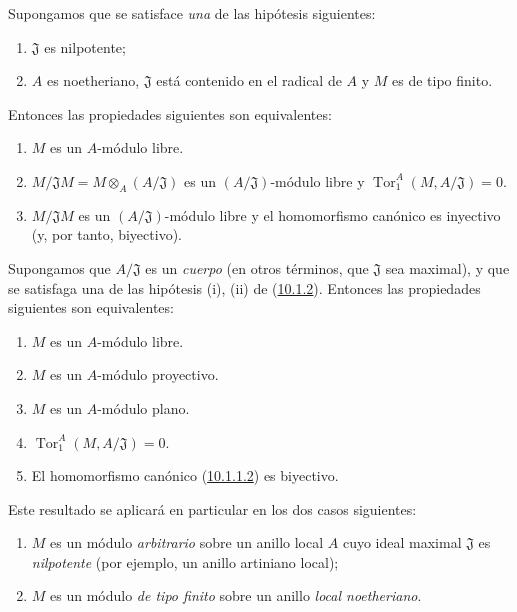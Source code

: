 \begin{env}[10.1.2]
\label{0.10.1.2}
\label{0.10.1.2-fr}
Supongamos que se satisface \emph{una} de las hipótesis siguientes:
\begin{enumerate}
  \item[(i)] $\mathfrak{J}$ es nilpotente;
  \item[(ii)] $A$ es noetheriano, $\mathfrak{J}$ está contenido en el radical de $A$ y $M$ es de tipo finito.
\end{enumerate}
Entonces las propiedades siguientes son equivalentes:
\begin{enumerate}
  \item[$a)$] $M$ es un $A$-módulo libre.
  \item[$b)$] $M/\mathfrak{J}M=M\otimes_A(A/\mathfrak{J})$ es un $(A/\mathfrak{J})$-módulo libre y $\operatorname{Tor}_1^A(M,A/\mathfrak{J})=0$.
  \item[$c)$] $M/\mathfrak{J}M$ es un $(A/\mathfrak{J})$-módulo libre y el homomorfismo canónico  es inyectivo (y, por tanto, biyectivo).
\end{enumerate}
\end{env}

\begin{env}[10.1.3]
\label{0.10.1.3}
\label{0.10.1.3-fr}
Supongamos que $A/\mathfrak{J}$ es un \emph{cuerpo} (en otros términos, que $\mathfrak{J}$ sea maximal), y que se satisfaga una de las hipótesis (i), (ii) de (\hyperref[0.10.1.2-fr]{10.1.2}). Entonces las propiedades siguientes son equivalentes:
\begin{enumerate}
  \item[$a)$] $M$ es un $A$-módulo libre.
  \item[$b)$] $M$ es un $A$-módulo proyectivo.
  \item[$c)$] $M$ es un $A$-módulo plano.
  \item[$d)$] $\operatorname{Tor}_1^A(M,A/\mathfrak{J})=0$.
  \item[$e)$] El homomorfismo canónico (\hyperref[0.10.1.1.2-fr]{10.1.1.2}) es biyectivo.
\end{enumerate}
Este resultado se aplicará en particular en los dos casos siguientes:
\begin{enumerate}
  \item[(i)] $M$ es un módulo \emph{arbitrario} sobre un anillo local $A$ cuyo ideal maximal $\mathfrak{J}$ es \emph{nilpotente} (por ejemplo, un anillo artiniano local);
  \item[(ii)] $M$ es un módulo \emph{de tipo finito} sobre un anillo \emph{local noetheriano}.
\end{enumerate}
\end{env}

